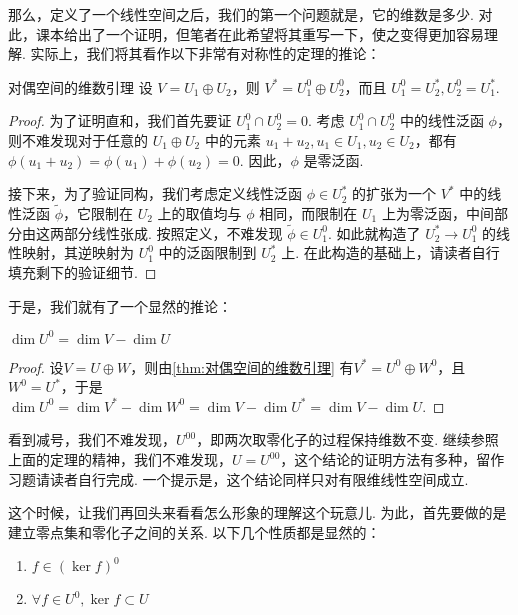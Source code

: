 那么，定义了一个线性空间之后，我们的第一个问题就是，它的维数是多少. 对此，课本给出了一个证明，但笔者在此希望将其重写一下，使之变得更加容易理解. 实际上，我们将其看作以下非常有对称性的定理的推论：

\begin{theorem}{}{对偶空间的维数引理}
    设 $V = U_1 \oplus U_2$，则 $V^* = U_1^0 \oplus U_2^0$，而且 $U_1^0 = U_2^*, U_2^0 = U_1^*$.
\end{theorem}


\begin{proof}
    为了证明直和，我们首先要证 $U_1^0 \cap U_2^0 = 0$. 考虑 $U_1^0 \cap U_2^0$ 中的线性泛函 $\phi$，则不难发现对于任意的 $U_1 \oplus U_2$ 中的元素 $u_1 + u_2, u_1 \in U_1, u_2 \in U_2$，都有 $\phi(u_1 + u_2) = \phi(u_1) + \phi(u_2) = 0$. 因此，$\phi$ 是零泛函.

    接下来，为了验证同构，我们考虑定义线性泛函 $\phi \in U_2^*$ 的扩张为一个 $V^*$ 中的线性泛函 $\tilde{\phi}$，它限制在 $U_2$ 上的取值均与 $\phi$ 相同，而限制在 $U_1$ 上为零泛函，中间部分由这两部分线性张成. 按照定义，不难发现 $\tilde \phi \in U_1^0$. 如此就构造了 $U_2^* \to U_1^0$ 的线性映射，其逆映射为 $U_1^0$ 中的泛函限制到 $U_2^*$ 上. 在此构造的基础上，请读者自行填充剩下的验证细节.
\end{proof}

于是，我们就有了一个显然的推论：

\begin{theorem}{}{}
    $\dim U^0 = \dim V - \dim U$
\end{theorem}
\begin{proof}
    设$V=U\oplus W$，则由\autoref{thm:对偶空间的维数引理} 有$V^*=U^0\oplus W^0$，且$W^0=U^*$，于是$\dim U^0=\dim V^*-\dim W^0=\dim V-\dim U^*=\dim V-\dim U$.
\end{proof}
看到减号，我们不难发现，$U^{00}$，即两次取零化子的过程保持维数不变. 继续参照上面的定理的精神，我们不难发现，$U = U^{00}$，这个结论的证明方法有多种，留作习题请读者自行完成. 一个提示是，这个结论同样只对有限维线性空间成立.

这个时候，让我们再回头来看看怎么形象的理解这个玩意儿. 为此，首先要做的是建立零点集和零化子之间的关系. 以下几个性质都是显然的：

\begin{lemma}{}{}
    \begin{enumerate}
        \item $f \in (\ker f)^0$
        \item $\forall f \in U^0, \ker f \subset U$
    \end{enumerate}
\end{lemma}

